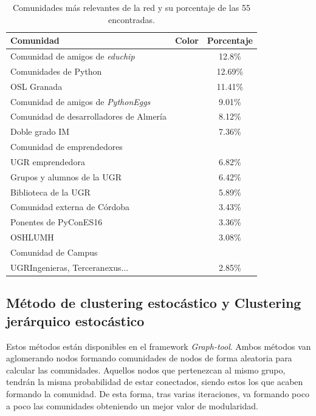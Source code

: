 \documentclass[paper=a4, fontsize=11pt]{article} %
\numberwithin{equation}{section} %
\numberwithin{figure}{section} %
\numberwithin{table}{section} %
\begin{document}
\begin{table}
  \begin{tabular}{l|c|c}
    Comunidad & Color & Porcentaje \\
    \hline
    Comunidad de amigos de \textit{educhip} & \cellcolor[RGB]{255, 186, 116} & 12.8\%\\
    Comunidades de Python & \cellcolor[RGB]{116,209,255} & 12.69\%\\
    OSL Granada & \cellcolor[RGB]{255, 153, 254} & 11.41\%\\
    Comunidad de amigos de \textit{PythonEggs} & \cellcolor[RGB]{200, 217, 117} & 9.01\%\\
    Comunidad de desarrolladores de Almería & \cellcolor[RGB]{255,207,173} & 8.12\%\\
    Doble grado IM & \cellcolor[RGB]{243,225,255} & 7.36\% \\
    Comunidad de emprendedores & \cellcolor[RGB]{138, 213, 168} & \\
    UGR emprendedora & \cellcolor[RGB]{138, 213, 168} & 6.82\%\\
    Grupos y alumnos de la UGR & \cellcolor[RGB]{213, 184, 138} & 6.42\%\\
    Biblioteca de la UGR & \cellcolor[RGB]{244,167,123} & 5.89\%\\
    Comunidad externa de Córdoba & \cellcolor[RGB]{133, 203, 195} & 3.43\%\\
    Ponentes de PyConES16 & \cellcolor[RGB]{255, 163, 163} &  3.36\%\\
    OSHLUMH & \cellcolor[RGB]{246, 197, 124} &  3.08\%\\
    Comunidad de Campus &\cellcolor[RGB]{153,255,128} & \\
    UGRIngenieras, Terceranexus... & \cellcolor[RGB]{153,255,128} & 2.85\%\\
  \end{tabular}
  \label{com_lov}
  \caption{Comunidades más relevantes de la red y su porcentaje de las 55 encontradas.}
\end{table}

\subsection{Método de clustering estocástico y Clustering jerárquico estocástico}

Estos métodos están disponibles en el framework \textit{Graph-tool}. Ambos métodos van aglomerando nodos formando comunidades de nodos de forma aleatoria para calcular las comunidades. Aquellos nodos que pertenezcan al mismo grupo, tendrán la misma probabilidad de estar conectados, siendo estos los que acaben formando la comunidad. De esta forma, tras varias iteraciones, va formando poco a poco las comunidades obteniendo un mejor valor de modularidad.
\end{document}
